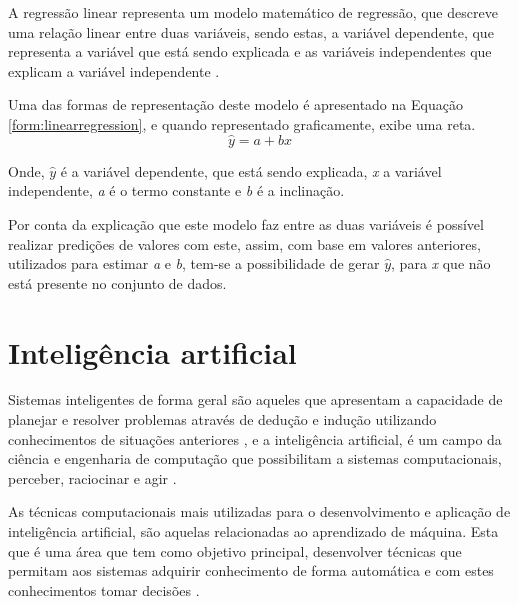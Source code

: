 \par A regressão linear representa um modelo matemático de regressão, que descreve uma relação linear entre duas variáveis, sendo estas, a variável dependente, que representa a variável que está sendo explicada e as variáveis independentes que explicam a variável independente \cite{mannprems2006}.

\par Uma das formas de representação deste modelo é apresentado na Equação \ref{form:linearregression}, e quando representado graficamente, exibe uma reta. 
\begin{equation}
    \widehat{y} = a + bx
\label{form:linearregression}
\end{equation}

\par Onde, $ \widehat{y} $ é a variável dependente, que está sendo explicada, \textit{x} a variável independente, \textit{a} é o termo constante e \textit{b} é a inclinação. 

\par Por conta da explicação que este modelo faz entre as duas variáveis é possível realizar predições de valores com este, assim, com base em valores anteriores, utilizados para estimar \textit{a} e \textit{b}, tem-se a possibilidade de gerar $ \widehat{y} $, para \textit{x} que não está presente no conjunto de dados.

\section{Inteligência artificial}

\par Sistemas inteligentes de forma geral são aqueles que apresentam a capacidade de planejar e resolver problemas através de dedução e indução utilizando conhecimentos de situações anteriores \cite{VonZuben2013}, e a inteligência artificial, é um campo da ciência e engenharia de computação \cite{VonZuben2013} que possibilitam a sistemas computacionais, perceber, raciocinar e agir \cite{Winston1992}.

\par As técnicas computacionais mais utilizadas para o desenvolvimento e aplicação de inteligência artificial, são aquelas relacionadas ao aprendizado de máquina. Esta que é uma área que tem como objetivo principal, desenvolver técnicas que permitam aos sistemas adquirir conhecimento de forma automática e com estes conhecimentos tomar decisões \cite{Augusto2007}.


